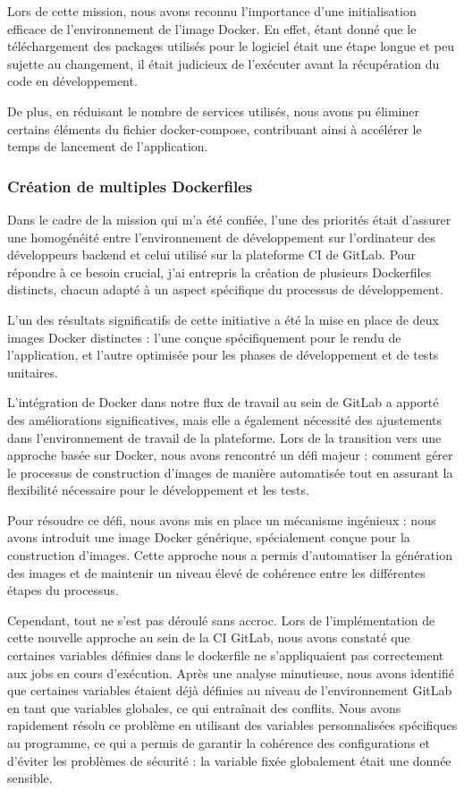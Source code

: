 Lors de cette mission, nous avons reconnu l'importance d'une initialisation efficace de l'environnement de l'image Docker.
En effet, étant donné que le téléchargement des packages utilisés pour le logiciel était une étape longue et peu sujette au changement, il était judicieux de l'exécuter avant la récupération du code en développement.

De plus, en réduisant le nombre de services utilisés, nous avons pu éliminer certains éléments du fichier docker-compose, contribuant ainsi à accélérer le temps de lancement de l'application.

\subsubsection{Création de multiples Dockerfiles}
Dans le cadre de la mission qui m'a été confiée, l'une des priorités était d'assurer une homogénéité entre l'environnement de développement sur l'ordinateur des développeurs backend et celui utilisé sur la plateforme CI de GitLab.
Pour répondre à ce besoin crucial, j'ai entrepris la création de plusieurs Dockerfiles distincts, chacun adapté à un aspect spécifique du processus de développement.

L'un des résultats significatifs de cette initiative a été la mise en place de deux images Docker distinctes : l'une conçue spécifiquement pour le rendu de l'application, et l'autre optimisée pour les phases de développement et de tests unitaires.

L'intégration de Docker dans notre flux de travail au sein de GitLab a apporté des améliorations significatives, mais elle a également nécessité des ajustements dans l'environnement de travail de la plateforme.
Lors de la transition vers une approche basée sur Docker, nous avons rencontré un défi majeur : comment gérer le processus de construction d'images de manière automatisée tout en assurant la flexibilité nécessaire pour le développement et les tests.

Pour résoudre ce défi, nous avons mis en place un mécanisme ingénieux : nous avons introduit une image Docker générique, spécialement conçue pour la construction d'images.
Cette approche nous a permis d'automatiser la génération des images et de maintenir un niveau élevé de cohérence entre les différentes étapes du processus.

Cependant, tout ne s'est pas déroulé sans accroc.
Lors de l'implémentation de cette nouvelle approche au sein de la CI GitLab, nous avons constaté que certaines variables définies dans le dockerfile ne s'appliquaient pas correctement aux jobs en cours d'exécution.
Après une analyse minutieuse, nous avons identifié que certaines variables étaient déjà définies au niveau de l'environnement GitLab en tant que variables globales, ce qui entraînait des conflits.
Nous avons rapidement résolu ce problème en utilisant des variables personnalisées spécifiques au programme, ce qui a permis de garantir la cohérence des configurations et d'éviter les problèmes de sécurité : la variable fixée globalement était une donnée sensible.

